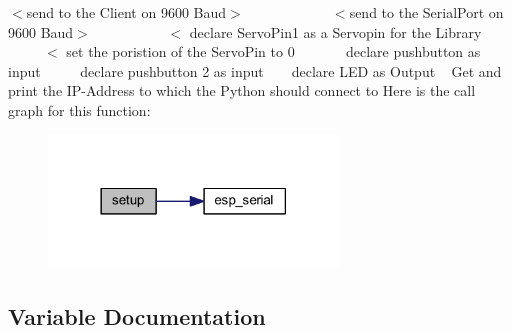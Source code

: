 $<$send to the Client on 9600 Baud$>$ ~\newline
~\newline
~\newline
~\newline
~\newline
~\newline
~\newline
 $<$send to the Serial\+Port on 9600 Baud$>$ ~\newline
~\newline
~\newline
~\newline
~\newline
~\newline
 $<$ declare Servo\+Pin1 as a Servopin for the Library ~\newline
~\newline
~\newline
~\newline
~\newline
 $<$ set the poristion of the Servo\+Pin to 0 ~\newline
~\newline
~\newline
~\newline
 declare pushbutton as input ~\newline
~\newline
~\newline
 declare pushbutton 2 as input ~\newline
~\newline
 declare L\+ED as Output ~\newline
 Get and print the I\+P-\/\+Address to which the Python should connect to Here is the call graph for this function\+:\nopagebreak
\begin{figure}[H]
\begin{center}
\leavevmode
\includegraphics[width=218pt]{_arduinopart_8ino_a4fc01d736fe50cf5b977f755b675f11d_cgraph}
\end{center}
\end{figure}


\subsection{Variable Documentation}
\mbox{\label{_arduinopart_8ino_acb85827c057a298dc883f002985f7abf}} 
